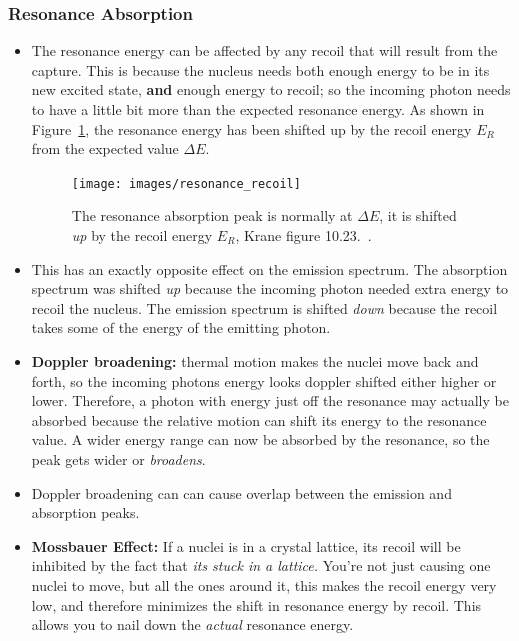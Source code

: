 \documentclass[letter]{article}
\begin{document}
\subsubsection{Resonance Absorption}
\begin{itemize}
\item The resonance energy can be affected by any recoil that will
  result from the capture. This is because the nucleus needs both
  enough energy to be in its new excited state, \textbf{and} enough energy
  to recoil; so the incoming photon needs to have a little bit more
  than the expected resonance energy. As shown in
  Figure~\ref{fig:resonance_recoil}, the resonance energy has been
  shifted up by the recoil energy $E_R$ from the expected value
  $\Delta{}E$.~\cite[Lec 25]{lecture}

  \begin{figure}[hbtp]
    \centering
    \texttt{[image: images/resonance\_recoil]}
    \caption{The resonance absorption peak is normally at $\Delta{}E$, it is
      shifted \textit{up} by the recoil energy $E_R$, Krane figure 10.23.~\cite{krane}.\label{fig:resonance_recoil}}
  \end{figure}
\item This has an exactly opposite effect on the emission
  spectrum. The absorption spectrum was shifted \textit{up} because the
  incoming photon needed extra energy to recoil the nucleus. The
  emission spectrum is shifted \textit{down} because the recoil takes some of
  the energy of the emitting photon.~\cite[Lec. 25]{lecture}
\item\textbf{Doppler broadening:} thermal motion makes the nuclei move back
  and forth, so the incoming photons energy looks doppler shifted
  either higher or lower. Therefore, a photon with energy just off the
  resonance may actually be absorbed because the relative motion can
  shift its energy to the resonance value. A wider energy range can
  now be absorbed by the resonance, so the peak gets wider or
  \textit{broadens}.~\cite[pp. 363]{krane}
\item Doppler broadening can can cause overlap between
  the emission and absorption peaks. ~\cite[Lec. 25]{lecture}
\item\textbf{Mossbauer Effect:} If a nuclei is in a crystal lattice,
  its recoil will be inhibited by the fact that \textit{its stuck in a
  lattice.} You're not just causing one nuclei to move, but
  all the ones around it, this makes the recoil energy very low, and
  therefore minimizes the shift in resonance energy by recoil. This
  allows you to nail down the \textit{actual} resonance
  energy.~\cite[Lec 25]{lecture}
\end{itemize}
\end{document}
